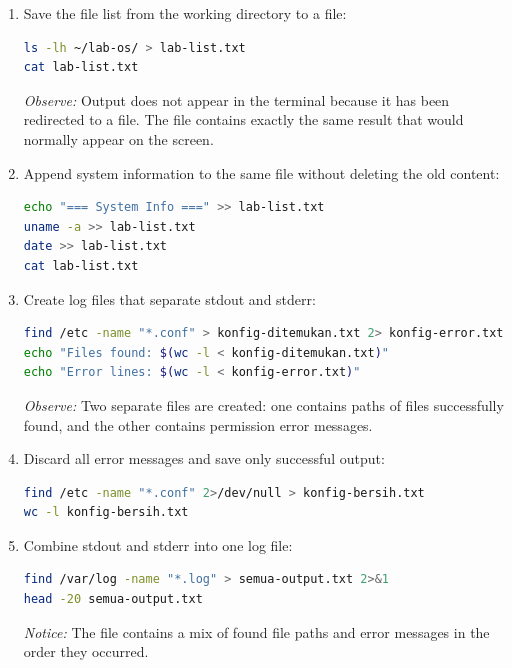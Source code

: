 \begin{enumerate}
    \item Save the file list from the working directory to a file:
\begin{lstlisting}[language=bash, caption={Saving output to a new file}]
ls -lh ~/lab-os/ > lab-list.txt
cat lab-list.txt
\end{lstlisting}
    \textit{Observe:} Output does not appear in the terminal because it has been redirected to a file. The  file contains exactly the same result that would normally appear on the screen.

    \item Append system information to the same file without deleting the old content:
\begin{lstlisting}[language=bash, caption={Appending output to an existing file}]
echo "=== System Info ===" >> lab-list.txt
uname -a >> lab-list.txt
date >> lab-list.txt
cat lab-list.txt
\end{lstlisting}

    \item Create log files that separate stdout and stderr:
\begin{lstlisting}[language=bash, caption={Separating stdout and stderr into different files}]
find /etc -name "*.conf" > konfig-ditemukan.txt 2> konfig-error.txt
echo "Files found: $(wc -l < konfig-ditemukan.txt)"
echo "Error lines: $(wc -l < konfig-error.txt)"
\end{lstlisting}
    \textit{Observe:} Two separate files are created: one contains paths of files successfully found, and the other contains permission error messages.

    \item Discard all error messages and save only successful output:
\begin{lstlisting}[language=bash, caption={Discarding stderr to /dev/null}]
find /etc -name "*.conf" 2>/dev/null > konfig-bersih.txt
wc -l konfig-bersih.txt
\end{lstlisting}

    \item Combine stdout and stderr into one log file:
\begin{lstlisting}[language=bash, caption={Combining stdout and stderr into one file}]
find /var/log -name "*.log" > semua-output.txt 2>&1
head -20 semua-output.txt
\end{lstlisting}
    \textit{Notice:} The  file contains a mix of found file paths and error messages in the order they occurred.
\end{enumerate}

